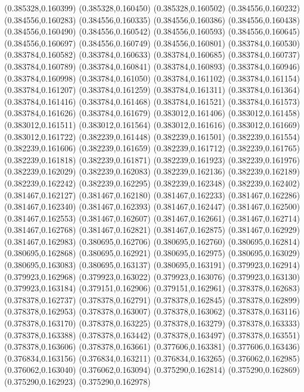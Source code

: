 (0.385328,0.160399)
(0.385328,0.160450)
(0.385328,0.160502)
(0.384556,0.160232)
(0.384556,0.160283)
(0.384556,0.160335)
(0.384556,0.160386)
(0.384556,0.160438)
(0.384556,0.160490)
(0.384556,0.160542)
(0.384556,0.160593)
(0.384556,0.160645)
(0.384556,0.160697)
(0.384556,0.160749)
(0.384556,0.160801)
(0.383784,0.160530)
(0.383784,0.160582)
(0.383784,0.160633)
(0.383784,0.160685)
(0.383784,0.160737)
(0.383784,0.160789)
(0.383784,0.160841)
(0.383784,0.160893)
(0.383784,0.160946)
(0.383784,0.160998)
(0.383784,0.161050)
(0.383784,0.161102)
(0.383784,0.161154)
(0.383784,0.161207)
(0.383784,0.161259)
(0.383784,0.161311)
(0.383784,0.161364)
(0.383784,0.161416)
(0.383784,0.161468)
(0.383784,0.161521)
(0.383784,0.161573)
(0.383784,0.161626)
(0.383784,0.161679)
(0.383012,0.161406)
(0.383012,0.161458)
(0.383012,0.161511)
(0.383012,0.161564)
(0.383012,0.161616)
(0.383012,0.161669)
(0.383012,0.161722)
(0.382239,0.161448)
(0.382239,0.161501)
(0.382239,0.161554)
(0.382239,0.161606)
(0.382239,0.161659)
(0.382239,0.161712)
(0.382239,0.161765)
(0.382239,0.161818)
(0.382239,0.161871)
(0.382239,0.161923)
(0.382239,0.161976)
(0.382239,0.162029)
(0.382239,0.162083)
(0.382239,0.162136)
(0.382239,0.162189)
(0.382239,0.162242)
(0.382239,0.162295)
(0.382239,0.162348)
(0.382239,0.162402)
(0.381467,0.162127)
(0.381467,0.162180)
(0.381467,0.162233)
(0.381467,0.162286)
(0.381467,0.162340)
(0.381467,0.162393)
(0.381467,0.162447)
(0.381467,0.162500)
(0.381467,0.162553)
(0.381467,0.162607)
(0.381467,0.162661)
(0.381467,0.162714)
(0.381467,0.162768)
(0.381467,0.162821)
(0.381467,0.162875)
(0.381467,0.162929)
(0.381467,0.162983)
(0.380695,0.162706)
(0.380695,0.162760)
(0.380695,0.162814)
(0.380695,0.162868)
(0.380695,0.162921)
(0.380695,0.162975)
(0.380695,0.163029)
(0.380695,0.163083)
(0.380695,0.163137)
(0.380695,0.163191)
(0.379923,0.162914)
(0.379923,0.162968)
(0.379923,0.163022)
(0.379923,0.163076)
(0.379923,0.163130)
(0.379923,0.163184)
(0.379151,0.162906)
(0.379151,0.162961)
(0.378378,0.162683)
(0.378378,0.162737)
(0.378378,0.162791)
(0.378378,0.162845)
(0.378378,0.162899)
(0.378378,0.162953)
(0.378378,0.163007)
(0.378378,0.163062)
(0.378378,0.163116)
(0.378378,0.163170)
(0.378378,0.163225)
(0.378378,0.163279)
(0.378378,0.163333)
(0.378378,0.163388)
(0.378378,0.163442)
(0.378378,0.163497)
(0.378378,0.163551)
(0.378378,0.163606)
(0.378378,0.163661)
(0.377606,0.163381)
(0.377606,0.163436)
(0.376834,0.163156)
(0.376834,0.163211)
(0.376834,0.163265)
(0.376062,0.162985)
(0.376062,0.163040)
(0.376062,0.163094)
(0.375290,0.162814)
(0.375290,0.162869)
(0.375290,0.162923)
(0.375290,0.162978)
